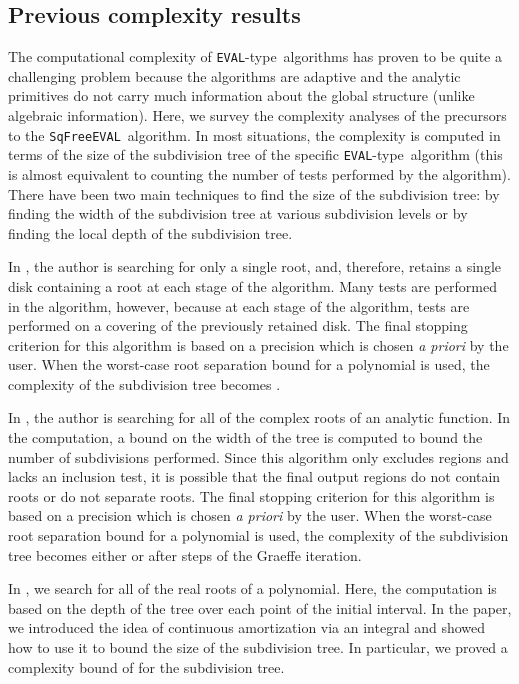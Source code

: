 \documentclass{amsart}
\theoremstyle{definition}
\newcommand{\EVAL}{\texttt{SqFreeEVAL}}
\newcommand{\EVALTYPE}{\texttt{EVAL}-type}
\begin{document}
\subsection{Previous complexity results}

The computational complexity of \EVALTYPE\ algorithms has proven to be quite a challenging problem because the algorithms are adaptive and the analytic primitives do not carry much information about the global structure (unlike algebraic information).  Here, we survey the complexity analyses of the precursors to the \EVAL\ algorithm.  In most situations, the complexity is computed in terms of the size of the subdivision tree of the specific \EVALTYPE\ algorithm (this is almost equivalent to counting the number of tests performed by the algorithm). There have been two main techniques to find the size of the subdivision tree: by finding the width of the subdivision tree at various subdivision levels or by finding the local depth of the subdivision tree.

In \citep{Henrici:search:70}, the author is searching for only a single root, and, therefore, retains a single disk containing a root at each stage of the algorithm.  Many tests are performed in the algorithm, however, because at each stage of the algorithm, tests are performed on a covering of the previously retained disk. The final stopping criterion for this algorithm is based on a precision  which is chosen {\em a priori} by the user.  When the worst-case root separation bound for a polynomial is used, the complexity of the subdivision tree becomes .

In \citep{Yakoubsohn:bisection:05}, the author is searching for all of the complex roots of an analytic function.  In the computation, a bound on the width of the tree is computed to bound the number of subdivisions performed.  Since this algorithm only excludes regions and lacks an inclusion test, it is possible that the final output regions do not contain roots or do not separate roots.  The final stopping criterion for this algorithm is based on a precision  which is chosen {\em a priori} by the user. When the worst-case root separation bound for a polynomial is used, the complexity of the subdivision tree becomes either  or  after  steps of the Graeffe iteration.

In \citep{Burr-Krahmer-Yap:integral:09}, we search for all of the real roots of a polynomial.  Here, the computation is based on the depth of the tree over each point of the initial interval.  In the paper, we introduced the idea of continuous amortization via an integral and showed how to use it to bound the size of the subdivision tree.  In particular, we proved a complexity bound of  for the subdivision tree.
\end{document}
